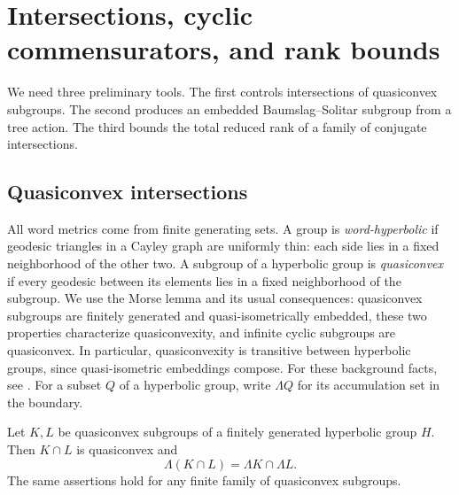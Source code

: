 \section{Intersections, cyclic commensurators, and rank bounds}
\label{pre:section}

We need three preliminary tools. The first controls intersections of
quasiconvex subgroups. The second produces an embedded Baumslag--Solitar
subgroup from a tree action. The third bounds the total reduced rank of
a family of conjugate intersections.

\subsection{Quasiconvex intersections}

All word metrics come from finite generating sets. A group is
\emph{word-hyperbolic} if geodesic triangles in a Cayley graph are
uniformly thin: each side lies in a fixed neighborhood of the other two.
A subgroup of a
hyperbolic group is \emph{quasiconvex} if every geodesic between its elements
lies in a fixed neighborhood of the subgroup. We use the Morse lemma and
its usual consequences: quasiconvex subgroups are finitely generated and
quasi-isometrically embedded, these two properties characterize
quasiconvexity, and infinite cyclic subgroups are quasiconvex. In particular,
quasiconvexity is transitive between hyperbolic groups, since
quasi-isometric embeddings compose. For these background facts, see
\cite[Theorem~III.H.1.7, Corollary~III.$\Gamma$.3.6(2), and
Corollary~III.$\Gamma$.3.10(1)]{BridsonHaefliger1999}.
For a subset \(Q\) of a hyperbolic
group, write \(\Lambda Q\) for its accumulation set in the boundary.

\begin{lemma}
\label{pre:quasiconvex-intersection}
Let \(K,L\) be quasiconvex subgroups of a finitely generated hyperbolic
group \(H\). Then \(K\cap L\) is quasiconvex and
\[
  \Lambda(K\cap L)=\Lambda K\cap\Lambda L.
\]
The same assertions hold for any finite family of quasiconvex subgroups.
\end{lemma}

